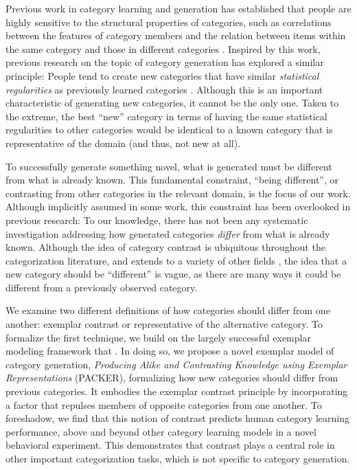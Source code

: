 \documentclass[12pt]{article}
\begin{document}
\begin{flushleft}
Previous work in category learning and generation has established that people are highly sensitive to the structural properties of categories, such as correlations between the features of category members and the relation between items within the same category and those in different categories \citep{roschmervis1975,regier2007,shepard1961learning,smith1995creative}. Inspired by this work, previous research on the topic of category generation has explored a similar principle: People tend to create new categories that have similar {\em statistical regularities} as previously learned categories \citep{jern2013probabilistic,ward1994structured}. Although this is an important characteristic of generating new categories, it cannot be the only one. Taken to the extreme, the best ``new'' category in terms of having the same statistical regularities to other categories would be identical to a known category that is representative of the domain (and thus, not new at all). 

To successfully generate something novel, what is generated must be different from what is already known. This fundamental constraint, ``being different'', or contrasting from other categories in the relevant domain, is the focus of our work. Although implicitly assumed in some work, this constraint has been overlooked in previous research: To our knowledge, there has not been any systematic investigation addressing how generated categories {\em differ} from what is already known. Although the idea of category contrast is ubiquitous throughout the categorization literature, and extends to a variety of other fields \citep[e.g., color;][]{regier2007}, the idea that a new category should be ``different'' is vague, as there are many ways it could be different from a previously observed category.

We examine two different definitions of how categories should differ from one another: exemplar contrast or representative of the alternative category. To formalize the first technique, we build on the largely successful exemplar modeling framework that \citep{medin1978context,nosofsky1984choice,nosofsky1986attention}. In doing so, we propose a novel exemplar model of category generation, {\em Producing Alike and Contrasting Knowledge using Exemplar Representations} (PACKER), formalizing how new categories should differ from previous categories. It embodies the exemplar contrast principle by incorporating a factor that repulses members of opposite categories from one another. To foreshadow, we find that this notion of contrast predicts human category learning performance, above and beyond other category learning models in a novel behavioral experiment. This demonstrates that contrast plays a central role in other important categorization tasks, which is not specific to category generation.


\end{flushleft}
\end{document}
